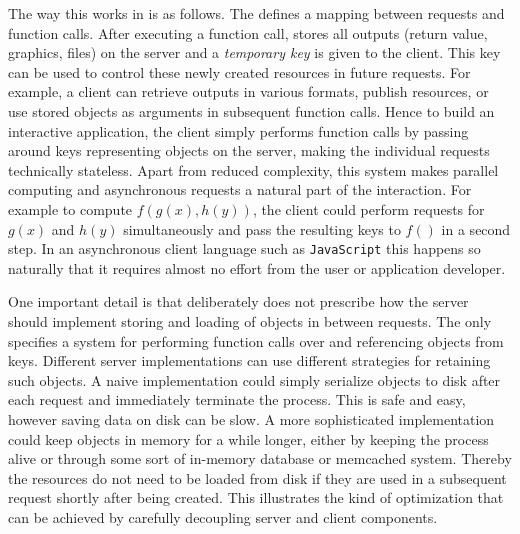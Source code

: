 The way this works in \OpenCPU is as follows. The \API defines a mapping between \HTTP requests and \R function calls. After executing a function call, \OpenCPU stores all outputs (return value, graphics, files) on the server and a \emph{temporary key} is given to the client. This key can be used to control these newly created resources in future requests. For example, a client can retrieve outputs in various formats, publish resources, or use stored \R objects as arguments in subsequent function calls. Hence to build an interactive application, the client simply performs function calls by passing around keys representing objects on the server, making the individual requests technically stateless. Apart from reduced complexity, this system makes parallel computing and asynchronous requests a natural part of the interaction. For example to compute $f(g(x), h(y))$, the client could perform \RPC requests for $g(x)$ and $h(y)$ simultaneously and pass the resulting keys to $f()$ in a second step. In an asynchronous client language such as \texttt{JavaScript} this happens so naturally that it requires almost no effort from the user or application developer.

One important detail is that \OpenCPU deliberately does not prescribe how the server should implement storing and loading of objects in between requests. The \API only specifies a system for performing \R function calls over \HTTP and referencing objects from keys. Different server implementations can use different strategies for retaining such objects. A naive implementation could simply serialize objects to disk after each request and immediately terminate the process. This is safe and easy, however saving data on disk can be slow. A more sophisticated implementation could keep objects in memory for a while longer, either by keeping the \R process alive or through some sort of in-memory database or memcached system. 
Thereby the resources do not need to be loaded from disk if they are used in a subsequent request shortly after being created. This illustrates the kind of optimization that can be achieved by carefully decoupling server and client components.
